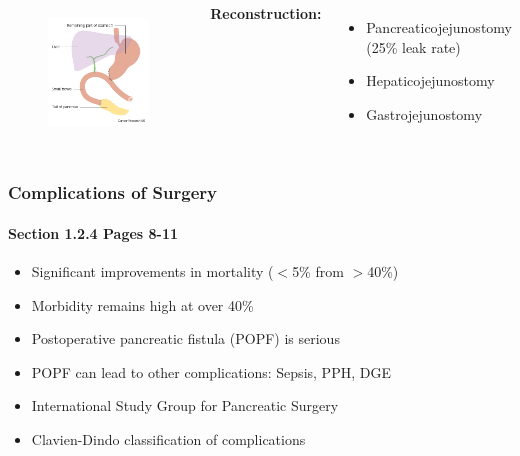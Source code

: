 \documentclass[10pt]{beamer}
\begin{document}
\begin{frame}
\begin{columns}[t]
		
		\begin{figure}
			\centering
			\includegraphics[width=0.8\linewidth]{whipple_schematic_post}
			\label{fig:whipple_schematic_post}
		\end{figure}
		{\scriptsize
		\textbf{Reconstruction:}
		\begin{itemize}
			\item Pancreaticojejunostomy (25\% leak rate)
			\item Hepaticojejunostomy
			\item Gastrojejunostomy
		\end{itemize}
		}
	\end{columns}
\end{frame}

\begin{frame}
	\frametitle{Complications of Surgery}
	\framesubtitle{Section 1.2.4 Pages 8-11}
	\begin{itemize}
		\item Significant improvements in mortality ($<$5\% from $>$40\%)
		\item Morbidity remains high at over 40\%
		\item Postoperative pancreatic fistula (POPF) is serious
		\item POPF can lead to other complications: Sepsis, PPH, DGE
		\item International Study Group for Pancreatic Surgery
		\item Clavien-Dindo classification of complications
	\end{itemize}
\end{frame}
\end{document}
